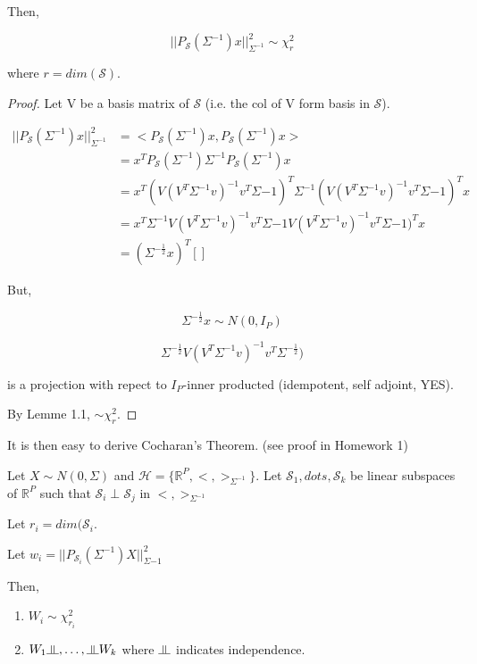 \documentclass[11pt,fleqn]{book} %
\newcommand{\indep}{\rotatebox[origin=c]{90}{$\models$}}
\begin{document}
  	Then, 

  	$$||P_\mathscr{S}(\Sigma^{-1})x||^2_{\Sigma^{-1}} \sim \chi^2_r $$

  	where $r = dim(\mathscr{S})$.

  	\begin{proof}
  		Let V be a basis matrix of $\mathscr{S}$ (i.e. the col of V form basis in $\mathscr{S}$).

  		$\begin{aligned}
  			||P_\mathscr{S}(\Sigma^{-1})x||^2_{\Sigma^{-1}} &= <P_\mathscr{S} (\Sigma^{-1}) x, P_\mathscr{S} (\Sigma^{-1}) x>\\
  				&= x^T P_\mathscr{S} (\Sigma^{-1}) \Sigma^{-1} P_\mathscr{S} (\Sigma^{-1}) x\\
  				&= x^T (V(V^T \Sigma^{-1} v)^{-1} v^T \Sigma{-1})^T \Sigma^{-1} (V(V^T \Sigma^{-1} v)^{-1} v^T \Sigma{-1})^T x\\
  				&= x^T \Sigma^{-1} V(V^T \Sigma^{-1} v)^{-1} v^T \Sigma{-1} V(V^T \Sigma^{-1} v)^{-1} v^T \Sigma{-1})^T x\\
  				&= (\Sigma^{-\frac{1}{2}} x)^T[]
  		\end{aligned}$

  		But, 

  		$$\Sigma^{-\frac{1}{2}} x \sim N(0, I_P) $$

  		$$ \Sigma^{-\frac{1}{2}} V(V^T \Sigma^{-1} v)^{-1} v^T \Sigma^{-\frac{1}{2}})$$

  		is a projection with repect to $I_P$-inner producted (idempotent, self adjoint, YES). 

  		By Lemme 1.1, $ \sim \chi^2_r$.

  		
  	\end{proof}
 
 It is then easy to derive Cocharan's Theorem. (see proof in Homework 1)

\begin{theorem}
	Let $X \sim N(0, \Sigma)$ and $\mathscr{H} = \{\mathbb{R}^P, <,>_{\Sigma^{-1}} \}$. Let $\mathscr{S}_1, dots, \mathscr{S}_k$ be linear subspaces of $\mathbb{R}^P$ such that $\mathscr{S}_i\perp\mathscr{S}_j$ in $<,>_{\Sigma^{-1}}$ 

	Let $r_i = dim(\mathscr{S}_i$.

	Let $w_i = || P_{\mathscr{S}_i} (\Sigma^{-1}) X||^2_{\Sigma{-1}}$

	Then, 

	\begin{enumerate}
		\item $W_i \sim \chi^2_{r_i}$
		\item $W_1 \indep, \dots, \indep W_k$ where $\indep$ indicates independence.
	\end{enumerate}
\end{theorem}
\end{document}
